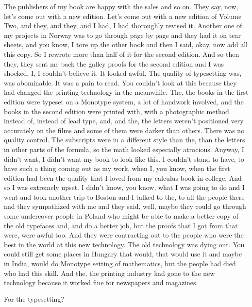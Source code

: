 \documentclass[]{article}
\begin{document}
The publishers of my book are happy with the sales and so on. They say,
now, let's come out with a new edition. Let's come out with a new
edition of Volume Two, and they, and they, and I had, I had thoroughly
revised it. Another one of my projects in Norway was to go through page
by page and they had it on tear sheets, and you know, I tore up the
other book and then I said, okay, now add all this copy. So I rewrote
more than half of it for the second edition. And so then they, they sent
me back the galley proofs for the second edition and I was shocked, I, I
couldn't believe it. It looked awful. The quality of typesetting was,
was abominable. It was a pain to read. You couldn't look at this because
they had changed the printing technology in the meanwhile. The, the
books in the first edition were typeset on a Monotype system, a lot of
handwork involved, and the books in the second edition were printed
with, with a photographic method instead of, instead of lead type, and,
and the, the letters weren't positioned very accurately on the films and
some of them were darker than others. There was no quality control. The
subscripts were in a different style than the, than the letters in other
parts of the formula, so the math looked especially atrocious. Anyway, I
didn't want, I didn't want my book to look like this. I couldn't stand
to have, to have such a thing coming out as my work, when I, you know,
when the first edition had been the quality that I loved from my
calculus book in college. And so I was extremely upset. I didn't know,
you know, what I was going to do and I went and took another trip to
Boston and I talked to the, to all the people there and they sympathized
with me and they said, well, maybe they could go through some undercover
people in Poland who might be able to make a better copy of the old
typefaces and, and do a better job, but the proofs that I got from that
were, were awful too. And they were contracting out to the people who
were the best in the world at this new technology. The old technology
was dying out. You could still get some places in Hungary that would,
that would use it and maybe in India, would do Monotype setting of
mathematics, but the people had died who had this skill. And the, the
printing industry had gone to the new technology because it worked fine
for newspapers and magazines.

For the typesetting?
\end{document}
